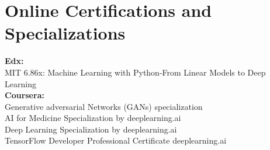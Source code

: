 \documentclass[letterpaper,11pt]{article}
\newcommand{\resumeSubHeadingListStart}{\begin{itemize}[leftmargin=0.15in, label={}]}
\newcommand{\resumeSubHeadingListEnd}{\end{itemize}}
\begin{document}
\section{Online Certifications and Specializations}
  \vspace{1pt}
  \resumeSubHeadingListStart
    \small{\item{
		    \textbf{Edx:\\}{MIT 6.86x: Machine Learning with Python-From Linear Models to Deep Learning}
		\textbf{\vspace{2pt}\\Coursera:\\}{Generative adversarial Networks (GANs) specialization\\AI for Medicine Specialization by deeplearning.ai\\Deep Learning Specialization by deeplearning.ai\\TensorFlow Developer Professional Certificate deeplearning.ai}



                }
        }
  \resumeSubHeadingListEnd
\end{document}
